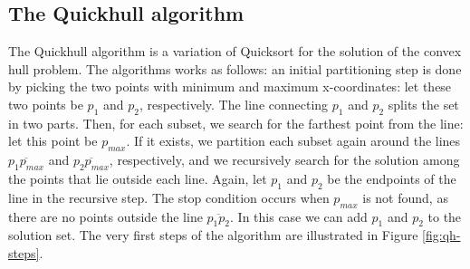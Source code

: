 \documentclass[]{finalproject}
\begin{document}
\subsection{The Quickhull algorithm}
The Quickhull algorithm is a variation of Quicksort for the solution of the convex hull problem.
The algorithms works as follows:
an initial partitioning step is done by picking the two points with minimum and maximum x-coordinates:
let these two points be $p_1$ and $p_2$, respectively.
The line connecting $p_1$ and $p_2$ splits the set in two parts.
Then, for each subset, we search for the farthest point from the line: let this point be $p_{max}$.
If it exists, we partition each subset again around the lines $\overline{p_1p_{max}}$ and $\overline{p_2p_{max}}$, respectively,
and we recursively search for the solution among the points that lie outside each line.
Again, let $p_1$ and $p_2$ be the endpoints of the line in the recursive step.
The stop condition occurs when $p_{max}$ is not found, as there are no points outside the line $\overline{p_1p_2}$.
In this case we can add $p_1$ and $p_2$ to the solution set.
The very first steps of the algorithm are illustrated in Figure \ref{fig:qh-steps}.
\end{document}
